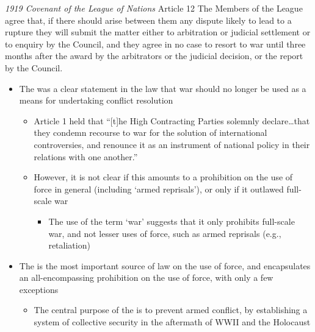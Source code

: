 \begin{conventiondetails}{\textit{1919 Covenant of the League of Nations} Article 12}
    \flushleft
    The Members of the League agree that, if there should arise between them any dispute likely to lead to a rupture they will submit the matter either to arbitration or judicial settlement or to enquiry by the Council, and they agree in no case to resort to war until three months after the award by the arbitrators or the judicial decision, or the report by the Council.
\end{conventiondetails}

\begin{itemize}
    \item The  was a clear statement in the law that war should no longer be used as a means for undertaking conflict resolution
    \begin{itemize}
        \item Article 1 held that ``[t]he High Contracting Parties solemnly declare…that they condemn recourse to war for the solution of international controversies, and renounce it as an instrument of national policy in their relations with one another.''
        \item However, it is not clear if this amounts to a prohibition on the use of force in general (including `armed reprisals'), or only if it outlawed full-scale war
        \begin{itemize}
            \item The use of the term `war' suggests that it only prohibits full-scale war, and not lesser uses of force, such as armed reprisals (e.g., retaliation)
        \end{itemize}
    \end{itemize}
    \item The  is the most important source of law on the use of force, and encapsulates an all-encompassing prohibition on the use of force, with only a few exceptions
    \begin{itemize}
        \item The central purpose of the  is to prevent armed conflict, by establishing a system of collective security in the aftermath of WWII and the Holocaust
    \end{itemize}
\end{itemize}

